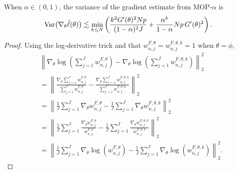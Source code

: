 \begin{thm}
    When $\alpha \in (0,1)$, the variance of the gradient estimate from MOP-$\alpha$ is
    \begin{equation}\mathrm{Var}\big(\nabla_\theta \hat\ell(\theta)\big) \lesssim \min_{k\leq N} \left(\frac{k^2G'(\theta)^2Np}{(1-\alpha)^2J} + \frac{\alpha^{k}}{1-\alpha}Np \, G'(\theta)^2 \right).
    \end{equation}
\end{thm}
\begin{proof}
    
Using the log-derivative trick and that $w_{n,j}^{F,\theta} = w_{n,j}^{F,\theta,k} = 1$ when $\theta=\phi$,
\begin{align}
    &\left\lVert\nabla_\theta\log\left(\sum_{j=1}^J w_{n,j}^{F,\theta}\right)-\nabla_\theta\log\left(\sum_{j=1}^J w_{n,j}^{F,\theta,k}\right)\right\rVert_2^2\\
    &= \left\lVert\frac{\nabla_\theta\sum_{j=1}^J w_{n,j}^{F,\theta}}{{\sum_{j=1}^J w_{n,j}^{F,\theta}}}-\frac{\nabla_\theta\sum_{j=1}^J w_{n,j}^{F,\theta,k}}{{\sum_{j=1}^J w_{n,j}^{F,\theta,k}}}\right\rVert_2^2 \\
    &= \left\lVert\frac{1}{J}\sum_{j=1}^J \nabla_\theta w_{n,j}^{F,\theta}-\frac{1}{J}\sum_{j=1}^J \nabla_\theta w_{n,j}^{F,\theta,k}\right\rVert_2^2 \\
    &= \left\lVert\frac{1}{J}\sum_{j=1}^J \frac{\nabla_\theta w_{n,j}^{F,\theta}}{w_{n,j}^{F,\theta}}-\frac{1}{J}\sum_{j=1}^J \frac{\nabla_\theta w_{n,j}^{F,\theta,k}}{w_{n,j}^{F,\theta,k}}\right\rVert_2^2\\
    &= \left\lVert\frac{1}{J}\sum_{j=1}^J \nabla_\theta \log\left(w_{n,j}^{F,\theta}\right)-\frac{1}{J}\sum_{j=1}^J \nabla_\theta \log\left(w_{n,j}^{F,\theta,k}\right)\right\rVert_2^2.
\end{align}


\end{proof}

